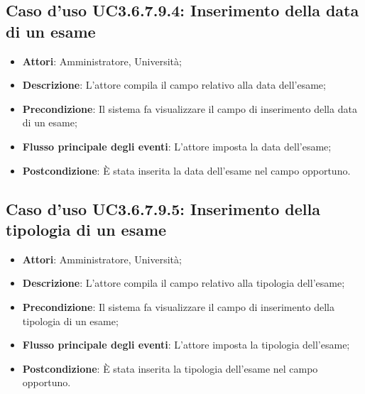 \subsection{Caso d'uso \texorpdfstring{UC3.6.7.9.4}{UC3.6.7.9.4}: Inserimento della data di un esame}
\begin{itemize}
\item \textbf{Attori}: Amministratore, Università;
\item \textbf{Descrizione}: L'attore compila il campo relativo alla data dell’esame;

\item \textbf{Precondizione}: Il sistema fa visualizzare il campo di inserimento della data di un esame;

\item \textbf{Flusso principale degli eventi}: L'attore imposta la data dell’esame;

\item \textbf{Postcondizione}: È stata inserita la data dell'esame nel campo opportuno.

\end{itemize}
\subsection{Caso d'uso \texorpdfstring{UC3.6.7.9.5}{UC3.6.7.9.5}: Inserimento della tipologia di un esame}
\begin{itemize}
\item \textbf{Attori}: Amministratore, Università;
\item \textbf{Descrizione}: L'attore compila il campo relativo alla tipologia dell’esame;

\item \textbf{Precondizione}: Il sistema fa visualizzare il campo di inserimento della tipologia di un esame;

\item \textbf{Flusso principale degli eventi}: L'attore imposta la tipologia dell’esame;

\item \textbf{Postcondizione}: È stata inserita la tipologia dell'esame nel campo opportuno.

\end{itemize}
